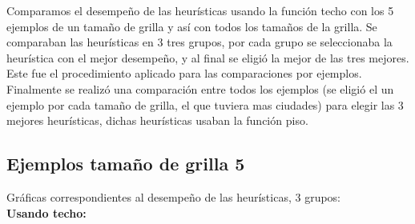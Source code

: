 \documentclass[a4paper,10pt]{article}
\begin{document}
Comparamos el desempeño de las heurísticas usando la función techo con los 5 ejemplos de un tamaño de grilla y así con todos los tamaños de la grilla. Se comparaban las heurísticas en 3 tres grupos,
por cada grupo se seleccionaba la heurística con el mejor desempeño, y al final se eligió la mejor de las tres mejores. Este fue el procedimiento aplicado para las comparaciones por ejemplos. Finalmente
se realizó una comparación entre todos los ejemplos (se eligió el un ejemplo por cada tamaño de grilla, el que tuviera mas ciudades) para elegir las 3 mejores heurísticas, dichas heurísticas
usaban la función piso. \\

\subsection{Ejemplos tamaño de grilla 5}

Gráficas correspondientes al desempeño de las heurísticas, 3 grupos:\\
\textbf{Usando techo:}
\end{document}
